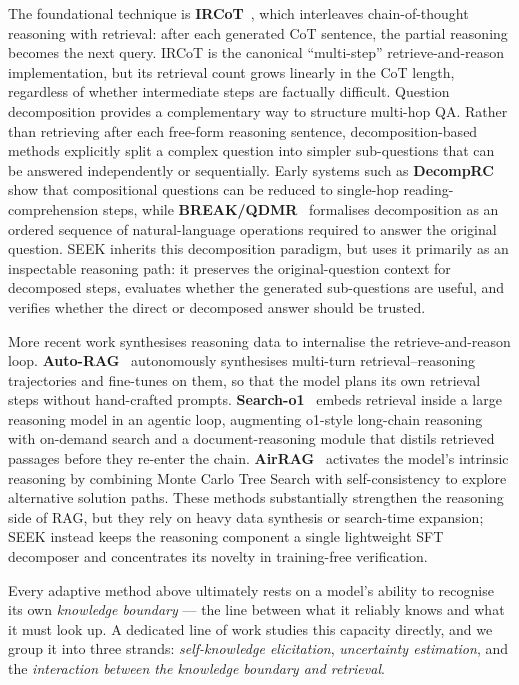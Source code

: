 \documentclass{nthu_thesis}
\begin{document}
\begin{thesiscjk}
The foundational technique is \textbf{IRCoT}~\cite{ircot}, which interleaves chain-of-thought reasoning with retrieval: after each generated CoT sentence, the partial reasoning becomes the next query. IRCoT is the canonical ``multi-step'' retrieve-and-reason implementation, but its retrieval count grows linearly in the CoT length, regardless of whether intermediate steps are factually difficult. Question decomposition provides a complementary way to structure multi-hop QA. Rather than retrieving after each free-form reasoning sentence, decomposition-based methods explicitly split a complex question into simpler sub-questions that can be answered independently or sequentially. Early systems such as \textbf{DecompRC}~\cite{decomprc} show that compositional questions can be reduced to single-hop reading-comprehension steps, while \textbf{BREAK/QDMR}~\cite{break_qdmr} formalises decomposition as an ordered sequence of natural-language operations required to answer the original question. SEEK inherits this decomposition paradigm, but uses it primarily as an inspectable reasoning path: it preserves the original-question context for decomposed steps, evaluates whether the generated sub-questions are useful, and verifies whether the direct or decomposed answer should be trusted.

More recent work synthesises reasoning data to internalise the retrieve-and-reason loop. \textbf{Auto-RAG}~\cite{autorag} autonomously synthesises multi-turn retrieval--reasoning trajectories and fine-tunes on them, so that the model plans its own retrieval steps without hand-crafted prompts. \textbf{Search-o1}~\cite{searcho1} embeds retrieval inside a large reasoning model in an agentic loop, augmenting o1-style long-chain reasoning with on-demand search and a document-reasoning module that distils retrieved passages before they re-enter the chain. \textbf{AirRAG}~\cite{airrag} activates the model's intrinsic reasoning by combining Monte Carlo Tree Search with self-consistency to explore alternative solution paths. These methods substantially strengthen the reasoning side of RAG, but they rely on heavy data synthesis or search-time expansion; SEEK instead keeps the reasoning component a single lightweight SFT decomposer and concentrates its novelty in training-free verification.

Every adaptive method above ultimately rests on a model's ability to recognise its own \emph{knowledge boundary} --- the line between what it reliably knows and what it must look up. A dedicated line of work studies this capacity directly, and we group it into three strands: \emph{self-knowledge elicitation}, \emph{uncertainty estimation}, and the \emph{interaction between the knowledge boundary and retrieval}.


\end{thesiscjk}
\end{document}
